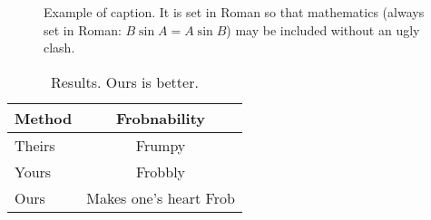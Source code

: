 \documentclass[10pt,twocolumn,letterpaper]{article}
\begin{document}
\begin{figure}[t]
\begin{center}
\fbox{\rule{0pt}{2in} \rule{0.9\linewidth}{0pt}}
\end{center}
   \caption{Example of caption.  It is set in Roman so that mathematics
   (always set in Roman: $B \sin A = A \sin B$) may be included without an
   ugly clash.}
\label{fig:long}
\label{fig:onecol}
\end{figure}

\begin{table}
\begin{center}
\begin{tabular}{|l|c|}
\hline
Method & Frobnability \\
\hline\hline
Theirs & Frumpy \\
Yours & Frobbly \\
Ours & Makes one's heart Frob\\
\hline
\end{tabular}
\end{center}
\caption{Results.   Ours is better.}
\end{table}

{\small


}
\end{document}
